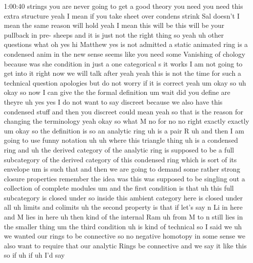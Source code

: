 \begin{unfinished}{1:00:40}
strings you are never going to get a good theory you need you need this extra structure yeah I mean if you take sheet over condens 
strink Sal doesn't I mean the same reason will hold yeah I mean this will be this will be your pullback in pre- sheeps and it is 
just not the right thing so yeah uh other questions what oh yes hi Matthew yes is not admitted a static animated ring is a 
condensed anim in the new sense seems like you need some Vanishing of chology because was she condition in just a one 
categorical s it works I am not going to get into it right now we will talk after yeah yeah this is not the time for such a 
technical question apologies but do not worry if it is correct yeah um okay so uh okay so now I can give the the formal 
definition um wait did you define are theyre uh yes yes I do not want to say discreet because we also have this condensed 
stuff and then you discreet could mean yeah so that is  the reason for changing the terminology yeah okay so what M no for no no 
right exactly exactly um okay so the definition is so an analytic ring uh is a pair R uh and then I am going to use funny notation 
uh uh where this triangle thing uh is a condensed ring and uh the derived category of the analytic ring is supposed to be a full 
subcategory of the derived category of this condensed ring which is sort of its envelope um is such that and then we are going to 
demand some rather strong closure properties remember the idea was this was supposed to be singling out a collection of complete 
modules um and the first condition is that uh this full subcategory is closed under so inside this ambient category here is closed 
under all uh limits and colimits uh the second property is that if let's say n Li in here and M lies in here uh then kind of the 
internal Ram uh from M to n still lies in the smaller thing um the third condition uh is kind of technical so I said we uh we 
wanted our rings to be connective so no negative homotopy in some sense we also want to require that our analytic Rings be 
connective and we say it like this so if uh if uh I'd say


\end{unfinished}
